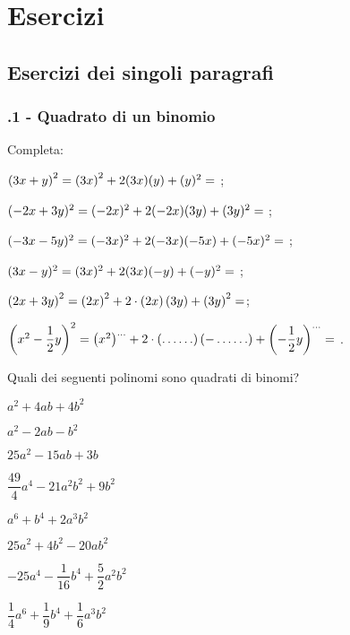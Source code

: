 \section{Esercizi}
\subsection{Esercizi dei singoli paragrafi}
\subsubsection*{\thechapter.1 - Quadrato di un binomio}
\begin{esercizio}
 \label{ese:12.1}
Completa:

\begin{enumeratea}
\item $ \left( 3x + y\right)^{2} = \left(3x\right)^{2} + 2(3x)(y) + (y) ^{2} = \dotfill~$;
\item $ (-2x + 3y)^{2} = (-2x)^{2} + 2(-2x)(3y) +(3y)^{2} = \dotfill~$;
\item $(-3x -5y)^{2} = (-3x)^{2} + 2(-3x)(-5x)+(-5x)^{2}= \dotfill~$;
\item $(3x - y)^{2} = (3x)^{2} +2(3x)(-y) + (-y)^{2} = \dotfill~$;
\item $\left(2x+3y\right)^{2}=\left(2x\right)^{2}+2\cdot\left(2x\right)\left(3y\right)+\left(3y\right)^{2}=\dotfill$;
\item $\left(x^{2}-\dfrac{1}{2}y\right)^{2}=\left(x^{2}\right)^{\ldots}+2\cdot%
\left(\ldots \ldots \right)\left(-\ldots \ldots%
\right)+\left(-{\dfrac{1}{2}}y\right)^{\ldots }=\dotfill~$.
\end{enumeratea}
\end{esercizio}


\begin{esercizio}
 \label{ese:12.2}
Quali dei seguenti polinomi sono quadrati di binomi?

\begin{multicols}{2}
\TabPositions{4cm}
\begin{enumeratea}
\spazielenx
\item $a^{2}+4{ab}+4b^{2}$ \tab\boxSi\quad\boxNo
\item $a^{2}-2{ab}-b^{2}$ \tab\boxSi\quad\boxNo
\item $25a^{2}-15{ab}+3b$ \tab\boxSi\quad\boxNo
\item $\dfrac{49}{4}a^{4}-21a^{2}b^{2}+9b^{2}$ \tab\boxSi\quad\boxNo
\item $a^{6}+b^{4}+2a^{3}b^{2}$ \tab\boxSi\quad\boxNo
\item $25a^{2}+4b^{2}-20{ab}^{2}$ \tab\boxSi\quad\boxNo
\item $-25a^{4}-\dfrac{1}{16}b^{4}+\dfrac{5}{2}a^{2}b^{2}$ \tab\boxSi\quad\boxNo
\item $\dfrac{1}{4}a^{6}+\dfrac{1}{9}b^{4}+\dfrac{1}{6}a^{3}b^{2}$ \tab\boxSi\quad\boxNo
\end{enumeratea}
\end{multicols}
\end{esercizio}

